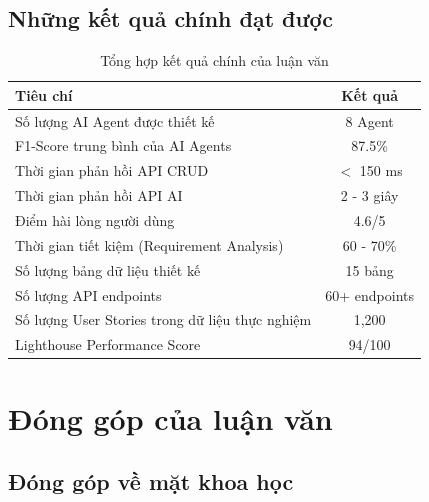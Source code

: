 \documentclass[12pt,a4paper]{report}
\begin{document}
\subsection{Những kết quả chính đạt được}

\begin{table}[H]
\centering
\caption{Tổng hợp kết quả chính của luận văn}
\begin{tabular}{|p{6cm}|c|}
\hline
\textbf{Tiêu chí} & \textbf{Kết quả} \\
\hline
Số lượng AI Agent được thiết kế & 8 Agent \\
\hline
F1-Score trung bình của AI Agents & 87.5\% \\
\hline
Thời gian phản hồi API CRUD & $<$ 150 ms \\
\hline
Thời gian phản hồi API AI & 2 - 3 giây \\
\hline
Điểm hài lòng người dùng & 4.6/5 \\
\hline
Thời gian tiết kiệm (Requirement Analysis) & 60 - 70\% \\
\hline
Số lượng bảng dữ liệu thiết kế & 15 bảng \\
\hline
Số lượng API endpoints & 60+ endpoints \\
\hline
Số lượng User Stories trong dữ liệu thực nghiệm & 1,200 \\
\hline
Lighthouse Performance Score & 94/100 \\
\hline
\end{tabular}
\label{tab:final_results}
\end{table}

\section{Đóng góp của luận văn}

\subsection{Đóng góp về mặt khoa học}
\end{document}
